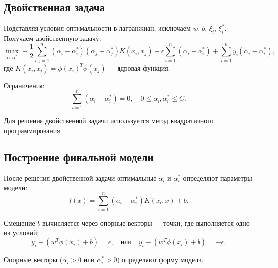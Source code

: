 \subsection{Двойственная задача}
\par Подставляя условия оптимальности в лагранжиан, исключаем \(w\), \(b\), \(\xi_i\), \(\xi_i^*\). Получаем двойственную задачу:
\begin{equation*}
    \max_{\alpha, \alpha^*} -\frac{1}{2} \sum_{i,j=1}^n (\alpha_i - \alpha_i^*)(\alpha_j - \alpha_j^*) K(x_i, x_j) 
    - \epsilon \sum_{i=1}^n (\alpha_i + \alpha_i^*) + \sum_{i=1}^n y_i (\alpha_i - \alpha_i^*),
\end{equation*}
где \(K(x_i, x_j) = \phi(x_i)^T \phi(x_j)\) — ядровая функция.
\par Ограничения:
\begin{equation*}
    \sum_{i=1}^n (\alpha_i - \alpha_i^*) = 0, \quad 0 \leq \alpha_i, \alpha_i^* \leq C.
\end{equation*}
\par Для решения двойственной задачи используется метод квадратичного программирования.

\subsection{Построение финальной модели}
\par После решения двойственной задачи оптимальные \(\alpha_i\) и \(\alpha_i^*\) определяют параметры модели:
\begin{equation*}
    f(x) = \sum_{i=1}^n (\alpha_i - \alpha_i^*) K(x_i, x) + b.
\end{equation*}
\par Смещение \(b\) вычисляется через опорные векторы — точки, где выполняется одно из условий:
\begin{equation*}
    y_i - (w^T \phi(x_i) + b) = \epsilon, \quad \text{или} \quad y_i - (w^T \phi(x_i) + b) = -\epsilon.
\end{equation*}
\par Опорные векторы (\(\alpha_i > 0\) или \(\alpha_i^* > 0\)) определяют форму модели.

